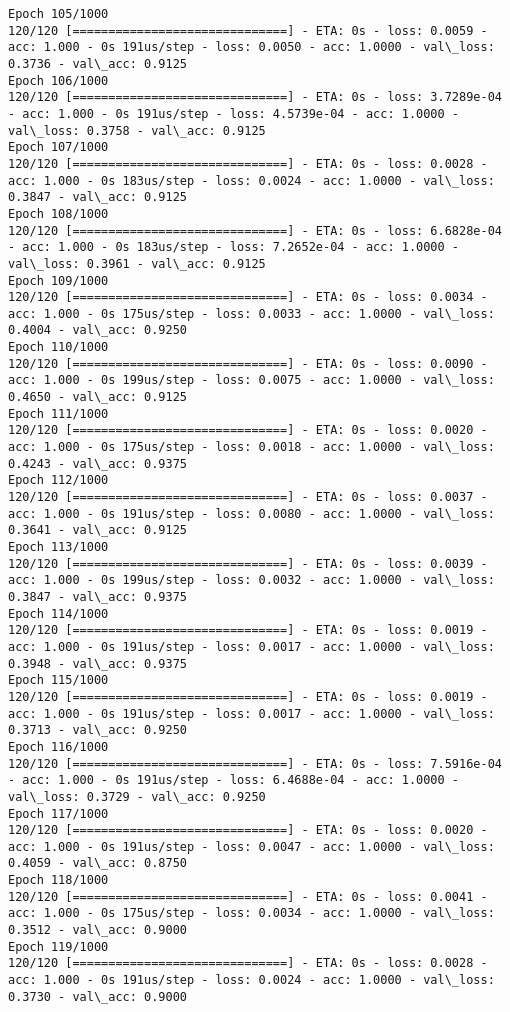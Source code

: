 \documentclass[11pt]{article}
\begin{document}
\begin{Verbatim}[commandchars=\\\{\}]
Epoch 105/1000
120/120 [==============================] - ETA: 0s - loss: 0.0059 - acc: 1.000 - 0s 191us/step - loss: 0.0050 - acc: 1.0000 - val\_loss: 0.3736 - val\_acc: 0.9125
Epoch 106/1000
120/120 [==============================] - ETA: 0s - loss: 3.7289e-04 - acc: 1.000 - 0s 191us/step - loss: 4.5739e-04 - acc: 1.0000 - val\_loss: 0.3758 - val\_acc: 0.9125
Epoch 107/1000
120/120 [==============================] - ETA: 0s - loss: 0.0028 - acc: 1.000 - 0s 183us/step - loss: 0.0024 - acc: 1.0000 - val\_loss: 0.3847 - val\_acc: 0.9125
Epoch 108/1000
120/120 [==============================] - ETA: 0s - loss: 6.6828e-04 - acc: 1.000 - 0s 183us/step - loss: 7.2652e-04 - acc: 1.0000 - val\_loss: 0.3961 - val\_acc: 0.9125
Epoch 109/1000
120/120 [==============================] - ETA: 0s - loss: 0.0034 - acc: 1.000 - 0s 175us/step - loss: 0.0033 - acc: 1.0000 - val\_loss: 0.4004 - val\_acc: 0.9250
Epoch 110/1000
120/120 [==============================] - ETA: 0s - loss: 0.0090 - acc: 1.000 - 0s 199us/step - loss: 0.0075 - acc: 1.0000 - val\_loss: 0.4650 - val\_acc: 0.9125
Epoch 111/1000
120/120 [==============================] - ETA: 0s - loss: 0.0020 - acc: 1.000 - 0s 175us/step - loss: 0.0018 - acc: 1.0000 - val\_loss: 0.4243 - val\_acc: 0.9375
Epoch 112/1000
120/120 [==============================] - ETA: 0s - loss: 0.0037 - acc: 1.000 - 0s 191us/step - loss: 0.0080 - acc: 1.0000 - val\_loss: 0.3641 - val\_acc: 0.9125
Epoch 113/1000
120/120 [==============================] - ETA: 0s - loss: 0.0039 - acc: 1.000 - 0s 199us/step - loss: 0.0032 - acc: 1.0000 - val\_loss: 0.3847 - val\_acc: 0.9375
Epoch 114/1000
120/120 [==============================] - ETA: 0s - loss: 0.0019 - acc: 1.000 - 0s 191us/step - loss: 0.0017 - acc: 1.0000 - val\_loss: 0.3948 - val\_acc: 0.9375
Epoch 115/1000
120/120 [==============================] - ETA: 0s - loss: 0.0019 - acc: 1.000 - 0s 191us/step - loss: 0.0017 - acc: 1.0000 - val\_loss: 0.3713 - val\_acc: 0.9250
Epoch 116/1000
120/120 [==============================] - ETA: 0s - loss: 7.5916e-04 - acc: 1.000 - 0s 191us/step - loss: 6.4688e-04 - acc: 1.0000 - val\_loss: 0.3729 - val\_acc: 0.9250
Epoch 117/1000
120/120 [==============================] - ETA: 0s - loss: 0.0020 - acc: 1.000 - 0s 191us/step - loss: 0.0047 - acc: 1.0000 - val\_loss: 0.4059 - val\_acc: 0.8750
Epoch 118/1000
120/120 [==============================] - ETA: 0s - loss: 0.0041 - acc: 1.000 - 0s 175us/step - loss: 0.0034 - acc: 1.0000 - val\_loss: 0.3512 - val\_acc: 0.9000
Epoch 119/1000
120/120 [==============================] - ETA: 0s - loss: 0.0028 - acc: 1.000 - 0s 191us/step - loss: 0.0024 - acc: 1.0000 - val\_loss: 0.3730 - val\_acc: 0.9000

\end{Verbatim}
\end{document}
